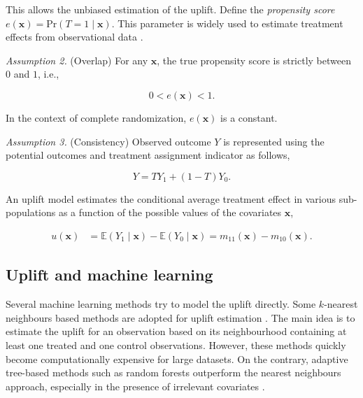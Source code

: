 \documentclass{article}
\def\x{\mathbf x}
\begin{document}
This allows the unbiased estimation of the uplift. Define the \textit{propensity score} $e(\x)= \mathrm{Pr}(T=1 \mid \x)$. This parameter is widely used to estimate treatment effects from observational data \citep{rubin1974estimating,rosenbaum1983central,athey2015machine}.

{\it Assumption 2.} (Overlap) For any $\x$, the true propensity score is strictly between $0$ and $1$, i.e., 

$$0 < e(\x) < 1.$$

In the context of complete randomization, $e(\x)$ is a constant. 

{\it Assumption 3.} (Consistency) Observed outcome $Y$ is represented using the potential outcomes and treatment assignment indicator as follows,

$$Y=TY_1 + (1-T)Y_0.$$


An uplift model estimates the conditional average treatment effect in various sub-populations as a function of the possible values of the covariates $\x$,

\begin{align}
    u(\x) &= \mathbb{E} ( Y_1 \mid \x) - \mathbb{E} ( Y_0 \mid \x) 
    =m_{11}(\x) - m_{10}(\x). 
    \label{eq:uplift}
\end{align}

\subsection{Uplift and machine learning}

Several machine learning methods try to model the uplift directly. Some $k$-nearest neighbours \citep{cover1967nearest} based methods are adopted for uplift estimation \citep{crump2008nonparametric, Alemi.etal-PersonalizedMedicine-2009, su2012facilitating}. The main idea is to estimate the uplift for an observation based on its neighbourhood containing at least one treated and one control observations. However, these methods quickly become computationally expensive for large datasets. On the contrary, adaptive tree-based methods such as random forests outperform the nearest neighbours approach, especially in the presence of irrelevant covariates \citep{wager2018estimation}. 
\end{document}
